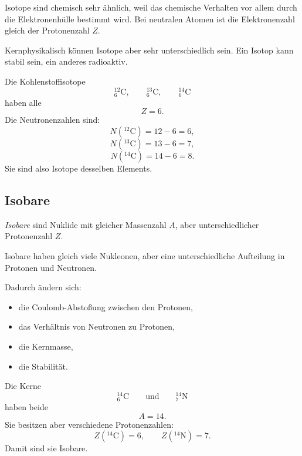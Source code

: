 \begin{conceptbox}
Isotope sind chemisch sehr ähnlich, weil das chemische Verhalten vor allem durch
die Elektronenhülle bestimmt wird.
Bei neutralen Atomen ist die Elektronenzahl gleich der Protonenzahl $Z$.

Kernphysikalisch können Isotope aber sehr unterschiedlich sein.
Ein Isotop kann stabil sein, ein anderes radioaktiv.
\end{conceptbox}

\begin{examplebox}
Die Kohlenstoffisotope
\[
    {}^{12}_{6}\mathrm{C},
    \qquad
    {}^{13}_{6}\mathrm{C},
    \qquad
    {}^{14}_{6}\mathrm{C}
\]
haben alle
\[
    Z=6.
\]
Die Neutronenzahlen sind:
\[
    N({}^{12}\mathrm{C})=12-6=6,
\]
\[
    N({}^{13}\mathrm{C})=13-6=7,
\]
\[
    N({}^{14}\mathrm{C})=14-6=8.
\]
Sie sind also Isotope desselben Elements.
\end{examplebox}

\subsection{Isobare}

\begin{definitionbox}
\emph{Isobare} sind Nuklide mit gleicher Massenzahl $A$, aber unterschiedlicher
Protonenzahl $Z$.
\end{definitionbox}

\begin{conceptbox}
Isobare haben gleich viele Nukleonen, aber eine unterschiedliche Aufteilung in
Protonen und Neutronen.

Dadurch ändern sich:
\begin{itemize}
    \item die Coulomb-Abstoßung zwischen den Protonen,
    \item das Verhältnis von Neutronen zu Protonen,
    \item die Kernmasse,
    \item die Stabilität.
\end{itemize}
\end{conceptbox}

\begin{examplebox}
Die Kerne
\[
    {}^{14}_{6}\mathrm{C}
    \qquad\text{und}\qquad
    {}^{14}_{7}\mathrm{N}
\]
haben beide
\[
    A=14.
\]
Sie besitzen aber verschiedene Protonenzahlen:
\[
    Z({}^{14}\mathrm{C})=6,
    \qquad
    Z({}^{14}\mathrm{N})=7.
\]
Damit sind sie Isobare.
\end{examplebox}

